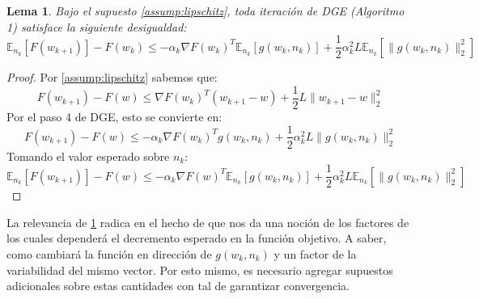 \documentclass{book}
\theoremstyle{plain}
\newtheorem{lem}[thm]{Lema}
\theoremstyle{definition}
\theoremstyle{remark}
\begin{document}
\begin{lem}\label{lem:markov}
Bajo el supuesto \ref{assump:lipschitz}, toda iteración de DGE (Algoritmo 1) satisface la siguiente desigualdad:
\begin{equation}
    \mathbb{E}_{n_k}[F(w_{k+1})] - F(w_{k}) \leq -\alpha_k\nabla F(w_{k})^T\mathbb{E}_{n_k}[g(w_{k}, n_{k})]+\frac{1}{2}\alpha^2_kL\mathbb{E}_{n_k}[\|g(w_{k}, n_{k})\|_2^2]
\end{equation}
\end{lem}

\begin{proof}

Por \ref{assump:lipschitz} sabemos que:
\begin{equation*}
    F(w_{k+1}) - F(w) \leq  \nabla F(w_{k})^T(w_{k+1}- w) + \frac{1}{2}L\|w_{k+1} - w\|_2^2
\end{equation*}
Por el paso 4 de DGE, esto se convierte en: 
\begin{equation*}
    F(w_{k+1}) - F(w) \leq  -\alpha_k\nabla F(w_k)^Tg(w_k, n_k) + \frac{1}{2}\alpha_k^2L\|g(w_k, n_k)\|_2^2
\end{equation*}
Tomando el valor esperado sobre $n_k$:
\begin{equation*}
    \mathbb{E}_{n_k}[F(w_{k+1})] - F(w) \leq  - \alpha_k\nabla F(w)^T\mathbb{E}_{n_k}[g(w_k, n_k)] + \frac{1}{2}\alpha_k^2L\mathbb{E}_{n_k}[\|g(w_k, n_k)\|_2^2]
\end{equation*}
\end{proof}

La relevancia de \ref{lem:markov} radica en el hecho de que nos da una noción de los factores de los cuales dependerá el decremento esperado en la función objetivo. A saber, como cambiará la función en dirección de $g(w_k, n_k)$ y un factor de la variabilidad del mismo vector. Por esto mismo, es necesario agregar supuestos adicionales sobre estas cantidades con tal de garantizar convergencia. 
\end{document}
